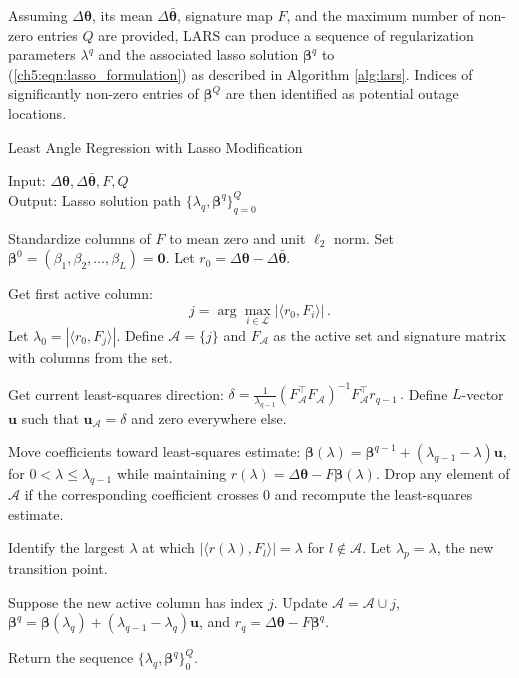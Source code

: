 Assuming $\Delta\boldsymbol{\theta}$, its mean $\Delta\bar{\boldsymbol{\theta}}$, signature map $F$, and the maximum number of non-zero entries $Q$ are provided, LARS can produce a sequence of regularization parameters $\lambda^q$ and the associated lasso solution $\boldsymbol{\beta}^q$ to (\ref{ch5:eqn:lasso_formulation}) as described in Algorithm \ref{alg:lars}. Indices of significantly non-zero entries of $\boldsymbol{\beta}^Q$ are then identified as potential outage locations. 
\begin{algorithm}
\caption{Least Angle Regression with Lasso Modification}
\label{alg:lars}
Input: $\Delta\boldsymbol{\theta}, \Delta\boldsymbol{\bar{\theta}}, F, Q$\\
Output: Lasso solution path $\{\lambda_q, \boldsymbol{\beta}^q\}_{q=0}^{Q}$
\begin{algorithmic}[1]
\State Standardize columns of $F$ to mean zero and unit $\ell_2$ norm. 
Set $\boldsymbol{\beta}^0 = (\beta_1, \beta_2, \dots, \beta_L) = \mathbf{0}$. Let $r_0 = \Delta\boldsymbol{\theta} - \Delta\boldsymbol{\bar{\theta}}$. 

\State Get first active column: 
$$
j = \arg\underset{i \in \mathcal{L}}\max|\langle r_0, F_i\rangle | \,.
$$
Let $\lambda_0 = |\langle r_0, F_j\rangle |$. Define $\mathcal{A} = \{j\}$ and $F_{\mathcal{A}}$ as the active set and signature matrix with columns from the set. 

\State Get current least-squares direction: 
$
\delta = \frac{1}{\lambda_{q - 1}}(F_{\mathcal{A}}^{\top}F_{\mathcal{A}})^{-1}F_{\mathcal{A}}^{\top}r_{q-1} \,.
$ 
Define $L$-vector $\mathbf{u}$ such that $\mathbf{u}_{\mathcal{A}} = \delta$ and zero everywhere else.

\State  Move coefficients toward least-squares estimate: $\boldsymbol{\beta}(\lambda) = \boldsymbol{\beta}^{q-1} + (\lambda_{q-1} - \lambda) \mathbf{u}$, for $0 < \lambda \le \lambda_{q-1}$ while maintaining $r(\lambda) = \Delta\boldsymbol{\theta} - F \boldsymbol{\beta}(\lambda)$. Drop any element of $\mathcal{A}$ if the corresponding coefficient crosses 0 and recompute the least-squares estimate. 

\State Identify the largest $\lambda$ at which $|\langle r(\lambda), F_l \rangle| = \lambda$ for $l \notin \mathcal{A}$. Let $\lambda_p = \lambda$, the new transition point.

\State Suppose the new active column has index $j$. Update $\mathcal{A} = \mathcal{A} \cup j$, $\boldsymbol{\beta}^q = \boldsymbol{\beta}(\lambda_q) + (\lambda_{q-1} - \lambda_q)\mathbf{u}$, and $r_q = \Delta\boldsymbol{\theta} - F \boldsymbol{\beta}^q$.
\EndFor

\State Return the sequence $\{\lambda_q, \boldsymbol{\beta}^q \}_0^Q$.
\end{algorithmic}
\end{algorithm}
